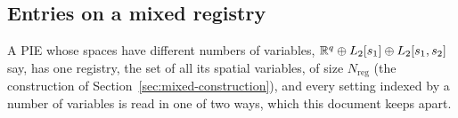 \begingroup\setlength{\emergencystretch}{6em}

\subsection{Entries on a mixed registry}\label{sec:mixed-settings}

A PIE whose spaces have different numbers of variables, $\mathbb{R}^q\oplus L_2[s_1]\oplus L_2[s_1,s_2]$ say, has one registry, the set of all its spatial variables, of size $N_{\mathrm{reg}}$ (the construction of Section~\ref{sec:mixed-construction}), and every setting indexed by a number of variables is read in one of two ways, which this document keeps apart.
